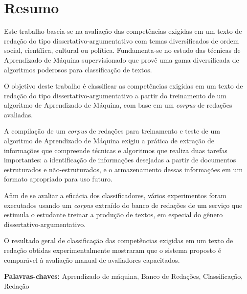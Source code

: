 \chapter*{Resumo}

\noindent Este trabalho baseia-se na avaliação das competências exigidas em um texto de redação do tipo dissertativo-argumentativo com temas diversificados de ordem social, científica, cultural ou política. Fundamenta-se no estudo das técnicas de Aprendizado de Máquina supervisionado que provê uma gama diversificada de algoritmos poderosos para classificação de textos.

O objetivo deste trabalho é classificar as competências exigidas em um texto de redação do tipo dissertativo-argumentativo a partir do treinamento de um algoritmo de Aprendizado de Máquina, com base em um \textit{corpus} de redações avaliadas.

A compilação de um \textit{corpus} de redações para treinamento e teste de um algoritmo de Aprendizado de Máquina exigiu a prática de extração de informações que compreende técnicas e algoritmos que realiza duas tarefas importantes: a identificação de informações desejadas a partir de documentos estruturados e não-estruturados, e o armazenamento dessas informações em um formato apropriado para uso futuro.

Afim de se avaliar a eficácia dos classificadores, vários experimentos foram executados usando um \textit{corpus} extraído do banco de redações de um serviço que estimula o estudante treinar a produção de textos, em especial do gênero dissertativo-argumentativo. 

O resultado geral de classificação das competências exigidas em um texto de redação obtidas experimentalmente mostraram que o sistema proposto é comparável à avaliação manual de avaliadores capacitados.

\textbf{Palavras-chaves:} Aprendizado de máquina, Banco de Redações, Classificação, Redação